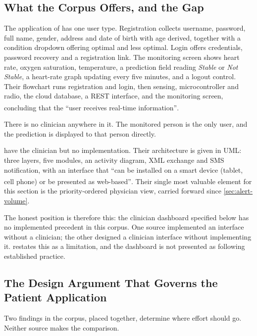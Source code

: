 \documentclass[12pt,a4paper,oneside]{report}
\newcommand{\bq}[1]{``#1''\textsuperscript{\dag}}
\begin{document}
\subsection{What the Corpus Offers, and the Gap}\label{sec:corpus-gap}

The application of \textcite{efendi2025} has one user type. Registration collects username, password, full name, gender, address and date of birth with age derived, together with a condition dropdown offering optimal and less optimal. Login offers credentials, password recovery and a registration link. The monitoring screen shows heart rate, oxygen saturation, temperature, a prediction field reading \emph{Stable} or \emph{Not Stable}, a heart-rate graph updating every five minutes, and a logout control. Their flowchart runs registration and login, then sensing, microcontroller and radio, the cloud database, a REST interface, and the monitoring screen, concluding that the \bq{user receives real-time information}.

There is no clinician anywhere in it. The monitored person is the only user, and the prediction is displayed to that person directly.

\Textcite{yazdani2018} have the clinician but no implementation. Their architecture is given in UML: three layers, five modules, an activity diagram, XML exchange and SMS notification, with an interface that \bq{can be installed on a smart device (tablet, cell phone) or be presented as web-based}. Their single most valuable element for this section is the priority-ordered physician view, carried forward since \cref{sec:alert-volume}.

The honest position is therefore this: the clinician dashboard specified below has no implemented precedent in this corpus. One source implemented an interface without a clinician; the other designed a clinician interface without implementing it.  restates this as a limitation, and the dashboard is not presented as following established practice.

\subsection{The Design Argument That Governs the Patient Application}\label{sec:app-argument}

Two findings in the corpus, placed together, determine where effort should go. Neither source makes the comparison.
\end{document}
